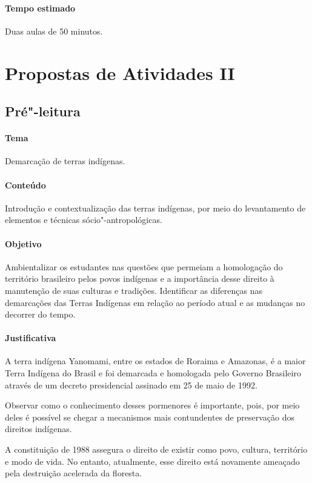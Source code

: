 \documentclass[12pt]{extarticle}
\begin{document}
\paragraph{Tempo estimado} Duas aulas de 50 minutos.


\section{Propostas de Atividades II}

\subsection{Pré"-leitura}

\paragraph{Tema} Demarcação de terras indígenas.

\paragraph{Conteúdo} Introdução e contextualização das terras indígenas, por meio
do levantamento de elementos e técnicas sócio"-antropológicas.

\paragraph{Objetivo} Ambientalizar os estudantes nas questões que permeiam a homologação
do território brasileiro pelos povos indígenas e a importância desse direito à manutenção
de suas culturas e tradições.
Identificar as diferenças nas demarcações das Terras Indígenas em relação ao período
atual e as mudanças no decorrer do tempo.

\paragraph{Justificativa} A terra indígena Yanomami, entre os estados de Roraima e Amazonas, 
é a maior Terra Indígena do Brasil e foi demarcada e homologada pelo Governo Brasileiro 
através de um decreto presidencial assinado em 25 de maio de 1992.

Observar como o conhecimento desses pormenores é importante, pois, por meio deles é
possível se chegar a mecanismos mais contundentes de preservação dos direitos indígenas. 

A constituição de 1988 assegura o direito de existir como povo, cultura, território e modo de vida.
No entanto, atualmente, esse direito está novamente ameaçado pela destruição acelerada da floresta.
\end{document}
